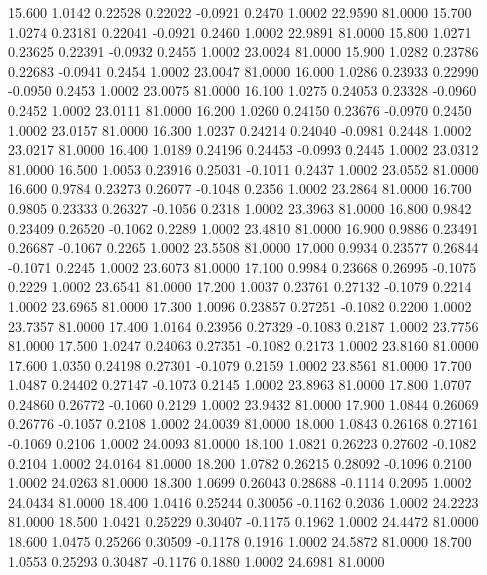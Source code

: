   15.600   1.0142   0.22528   0.22022  -0.0921   0.2470   1.0002  22.9590  81.0000
  15.700   1.0274   0.23181   0.22041  -0.0921   0.2460   1.0002  22.9891  81.0000
  15.800   1.0271   0.23625   0.22391  -0.0932   0.2455   1.0002  23.0024  81.0000
  15.900   1.0282   0.23786   0.22683  -0.0941   0.2454   1.0002  23.0047  81.0000
  16.000   1.0286   0.23933   0.22990  -0.0950   0.2453   1.0002  23.0075  81.0000
  16.100   1.0275   0.24053   0.23328  -0.0960   0.2452   1.0002  23.0111  81.0000
  16.200   1.0260   0.24150   0.23676  -0.0970   0.2450   1.0002  23.0157  81.0000
  16.300   1.0237   0.24214   0.24040  -0.0981   0.2448   1.0002  23.0217  81.0000
  16.400   1.0189   0.24196   0.24453  -0.0993   0.2445   1.0002  23.0312  81.0000
  16.500   1.0053   0.23916   0.25031  -0.1011   0.2437   1.0002  23.0552  81.0000
  16.600   0.9784   0.23273   0.26077  -0.1048   0.2356   1.0002  23.2864  81.0000
  16.700   0.9805   0.23333   0.26327  -0.1056   0.2318   1.0002  23.3963  81.0000
  16.800   0.9842   0.23409   0.26520  -0.1062   0.2289   1.0002  23.4810  81.0000
  16.900   0.9886   0.23491   0.26687  -0.1067   0.2265   1.0002  23.5508  81.0000
  17.000   0.9934   0.23577   0.26844  -0.1071   0.2245   1.0002  23.6073  81.0000
  17.100   0.9984   0.23668   0.26995  -0.1075   0.2229   1.0002  23.6541  81.0000
  17.200   1.0037   0.23761   0.27132  -0.1079   0.2214   1.0002  23.6965  81.0000
  17.300   1.0096   0.23857   0.27251  -0.1082   0.2200   1.0002  23.7357  81.0000
  17.400   1.0164   0.23956   0.27329  -0.1083   0.2187   1.0002  23.7756  81.0000
  17.500   1.0247   0.24063   0.27351  -0.1082   0.2173   1.0002  23.8160  81.0000
  17.600   1.0350   0.24198   0.27301  -0.1079   0.2159   1.0002  23.8561  81.0000
  17.700   1.0487   0.24402   0.27147  -0.1073   0.2145   1.0002  23.8963  81.0000
  17.800   1.0707   0.24860   0.26772  -0.1060   0.2129   1.0002  23.9432  81.0000
  17.900   1.0844   0.26069   0.26776  -0.1057   0.2108   1.0002  24.0039  81.0000
  18.000   1.0843   0.26168   0.27161  -0.1069   0.2106   1.0002  24.0093  81.0000
  18.100   1.0821   0.26223   0.27602  -0.1082   0.2104   1.0002  24.0164  81.0000
  18.200   1.0782   0.26215   0.28092  -0.1096   0.2100   1.0002  24.0263  81.0000
  18.300   1.0699   0.26043   0.28688  -0.1114   0.2095   1.0002  24.0434  81.0000
  18.400   1.0416   0.25244   0.30056  -0.1162   0.2036   1.0002  24.2223  81.0000
  18.500   1.0421   0.25229   0.30407  -0.1175   0.1962   1.0002  24.4472  81.0000
  18.600   1.0475   0.25266   0.30509  -0.1178   0.1916   1.0002  24.5872  81.0000
  18.700   1.0553   0.25293   0.30487  -0.1176   0.1880   1.0002  24.6981  81.0000
